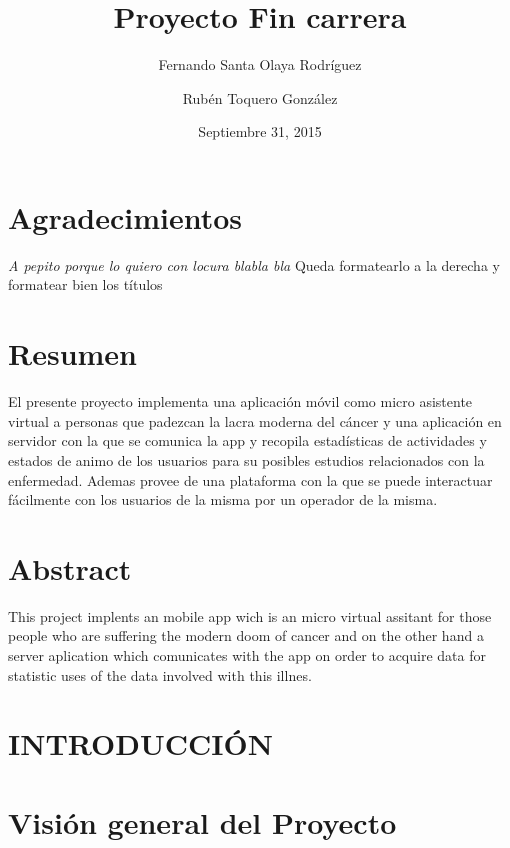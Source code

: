 \documentclass[b5paper,10pt,twoside]{book}
\title{Proyecto Fin carrera}
\author{Fernando Santa Olaya Rodríguez \\
	\and 
	Rubén Toquero González}
\date{Septiembre 31, 2015}
\begin{document}
	\maketitle
	\chapter*{Agradecimientos}
	\textit{A pepito porque lo quiero con locura blabla bla} Queda formatearlo a la derecha y  formatear bien los títulos
	\chapter*{Resumen}
	 	El presente proyecto implementa una aplicación móvil como micro asistente virtual a personas que padezcan la lacra moderna del cáncer y una aplicación en servidor con la que se comunica la app y recopila estadísticas de actividades y estados de animo de los usuarios para su posibles estudios relacionados con la enfermedad. Ademas provee de una plataforma con la que se puede interactuar fácilmente con los usuarios de la misma por un operador de la misma. 
	 
	\chapter*{Abstract}
	 	This project implents an mobile app wich is an micro virtual assitant for those people who are suffering the modern doom of cancer and on the other hand a server aplication which comunicates with the app on order to acquire data for statistic uses of the data involved with this illnes. 
	
	\tableofcontents
	
	\chapter{INTRODUCCIÓN}
	
	
	
	\chapter{Visión general del Proyecto}

	
		
	
\end{document}
